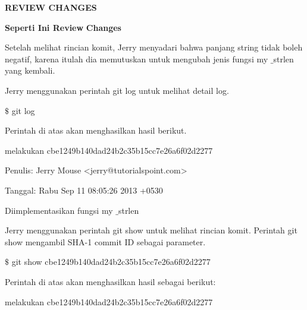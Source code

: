 \vspace{12pt}
\vspace{12pt}
\vspace{12pt}
\noindent 
\begin{center}{\fontsize{14pt}{14pt}\selectfont \textbf{REVIEW CHANGES} \\}\end{center} \par
\noindent 
{\fontsize{14pt}{14pt}\selectfont \textbf{Seperti Ini Review}\textbf{ Changes} \\} \par
\noindent 
Setelah melihat rincian komit, Jerry menyadari bahwa panjang string tidak boleh negatif, karena itulah dia memutuskan untuk mengubah jenis fungsi my $  \_  $strlen yang kembali. \par
\noindent 
 \hspace*{0.5in} Jerry menggunakan perintah git log untuk melihat detail log. \par
\noindent 
  $  \$  $ git log \par
\noindent 
Perintah di atas akan menghasilkan hasil berikut. \par
\noindent 
 \hspace*{0.5in}  \hspace*{0.5in} melakukan cbe1249b140dad24b2c35b15cc7e26a6f02d2277 \par
\noindent 
 \hspace*{0.5in} Penulis: Jerry Mouse <jerry@tutorialspoint.com> \par
\noindent 
 \hspace*{0.5in} Tanggal: Rabu Sep 11 08:05:26 2013 +0530 \par
\noindent 
 \hspace*{0.5in} Diimplementasikan fungsi my $  \_  $strlen \par
\noindent 
 \hspace*{0.5in} Jerry menggunakan perintah git show untuk melihat rincian komit. Perintah git show mengambil SHA-1 commit ID sebagai parameter. \par
\noindent 
 \hspace*{0.5in}  $  \$  $ git show cbe1249b140dad24b2c35b15cc7e26a6f02d2277 \par
\noindent 
 \hspace*{0.5in} Perintah di atas akan menghasilkan hasil sebagai berikut: \par
\noindent 
 \hspace*{0.5in} melakukan cbe1249b140dad24b2c35b15cc7e26a6f02d2277 \par
